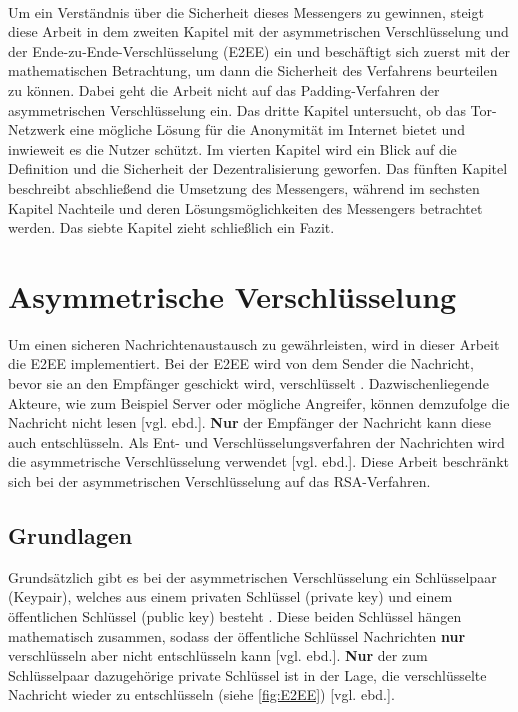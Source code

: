 \documentclass[a4paper,ngerman, headheight=28pt,12pt]{scrartcl}
\newcommand{\vcite}[1]{\cite[vgl.][]{#1}}
\newcommand{\vebd}{[vgl. ebd.]}
\begin{document}
\\
Um ein Verständnis über die Sicherheit dieses Messengers zu gewinnen, steigt diese Arbeit in dem zweiten Kapitel mit der asymmetrischen Verschlüsselung und der Ende-zu-Ende-Verschlüsselung (E2EE) ein und beschäftigt sich zuerst mit der mathematischen Betrachtung, um dann die Sicherheit des Verfahrens beurteilen zu können. Dabei geht die Arbeit nicht auf das Padding-Verfahren der asymmetrischen Verschlüsselung ein. Das dritte Kapitel untersucht, ob das Tor-Netzwerk eine mögliche Lösung für die Anonymität im Internet bietet und inwieweit es die Nutzer schützt. Im vierten Kapitel wird ein Blick auf die Definition und die Sicherheit der Dezentralisierung geworfen. Das fünften Kapitel beschreibt abschließend die Umsetzung des Messengers, während im sechsten Kapitel Nachteile und deren Lösungsmöglichkeiten des Messengers betrachtet werden. Das siebte Kapitel zieht schließlich ein Fazit.


\section{Asymmetrische Verschlüsselung}
Um einen sicheren Nachrichtenaustausch zu gewährleisten, wird in dieser Arbeit die E2EE implementiert. Bei der E2EE wird von dem Sender die Nachricht, bevor sie an den Empfänger geschickt wird, verschlüsselt \vcite{E2EE}. Dazwischenliegende Akteure, wie zum Beispiel Server oder mögliche Angreifer, können demzufolge die Nachricht nicht lesen \vebd. \textbf{Nur} der Empfänger der Nachricht kann diese auch entschlüsseln. Als Ent- und Verschlüsselungsverfahren der Nachrichten wird die asymmetrische Verschlüsselung verwendet \vebd. Diese Arbeit beschränkt sich bei der asymmetrischen Verschlüsselung auf das RSA-Verfahren.
\subsection{Grundlagen}
Grundsätzlich gibt es bei der asymmetrischen Verschlüsselung ein Schlüsselpaar (Keypair), welches aus einem privaten Schlüssel (private key) und einem öffentlichen Schlüssel (public key) besteht \vcite{Rsa-Basics}. Diese beiden Schlüssel hängen mathematisch zusammen, sodass der öffentliche Schlüssel Nachrichten \textbf{nur} verschlüsseln aber nicht entschlüsseln kann \vebd. \textbf{Nur} der zum Schlüsselpaar dazugehörige private Schlüssel ist in der Lage, die verschlüsselte Nachricht wieder zu entschlüsseln (siehe \cref{fig:E2EE}) \vebd.
\end{document}

